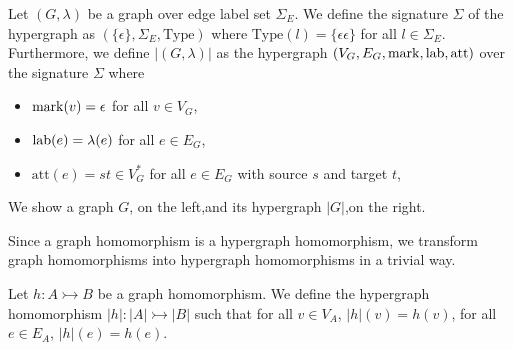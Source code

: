 \begin{definition}
    Let $(G,\lambda)$ be a graph over edge label set $\Sigma_E$.
    We define the signature $\Sigma$ of the hypergraph as
    $(\{\epsilon\}, \Sigma_E, \text{Type})$ where $\text{Type}(l) = \{\epsilon\epsilon\}$ for all $l \in \Sigma_E$. 
    Furthermore, we define $|(G,\lambda)|$ as the hypergraph $(V_G, E_G,\operatorname{mark}, \operatorname{lab},\text{att})$ over the signature $\Sigma$ where
    \begin{itemize}
        \item $\operatorname{mark}(v) = \epsilon$ for all $v \in V_G$,
        \item $\operatorname{lab}(e) = \lambda(e)$ for all $e \in E_G$,
        \item $\text{att}(e) = st \in V_G^*$ for all $e \in E_G$ with source $s$ and target $t$,
    \end{itemize}
\end{definition}

\begin{example}
    We show a graph $G$, on the left,and its hypergraph $|G|$,on the right.

    \hspace{1cm}
\end{example}

Since a graph homomorphism is a hypergraph homomorphism, we transform graph homomorphisms into hypergraph homomorphisms in a trivial way.
\begin{definition}
    Let $h: A \rightarrowtail B$ be a graph homomorphism. We define the hypergraph homomorphism $|h| : |A| \rightarrowtail |B|$ such that for all $v \in V_A$, $|h|(v) = h(v)$, for all $e \in E_A$, $|h|(e) = h(e)$.
\end{definition}


